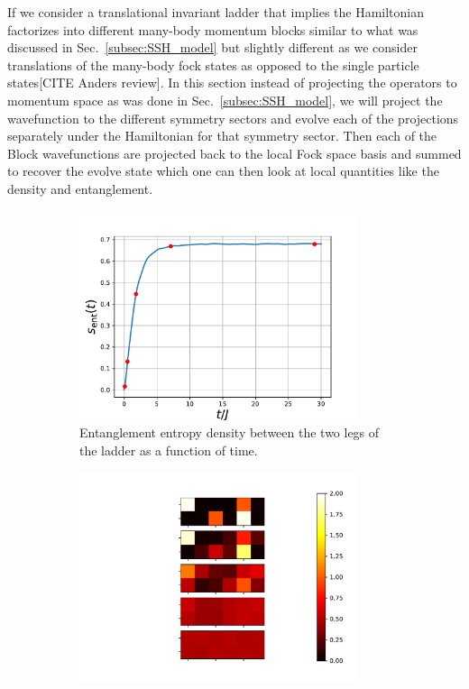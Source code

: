 \documentclass{SciPost}
\newcommand\0{\scalebox{-1}[1]{0}}
\begin{document}
If we consider a translational invariant ladder that implies the Hamiltonian factorizes into different many-body momentum blocks similar to what was discussed in Sec.~\ref{subsec:SSH_model} but slightly different as we consider translations of the many-body fock states as opposed to the single particle states[CITE Anders review]. In this section instead of projecting the operators to momentum space as was done in Sec.~\ref{subsec:SSH_model}, we will project the wavefunction to the different symmetry sectors and evolve each of the projections separately under the Hamiltonian for that symmetry sector. Then each of the Block wavefunctions are projected back to the local Fock space basis and summed to recover the evolve state which one can then look at local quantities like the density and entanglement.
\begin{figure}[t!]
	\centering
	\begin{subfigure}[a]{0.496\textwidth}
		\includegraphics[width=0.9\textwidth]{boson_entropy.pdf}
		\caption{Entanglement entropy density between the two legs of the ladder as a function of time.}
	\end{subfigure}
	\begin{subfigure}[b]{0.496\textwidth}
		\includegraphics[width=0.9\textwidth]{boson_density.pdf}

\end{subfigure}
\end{figure}
\end{document}
